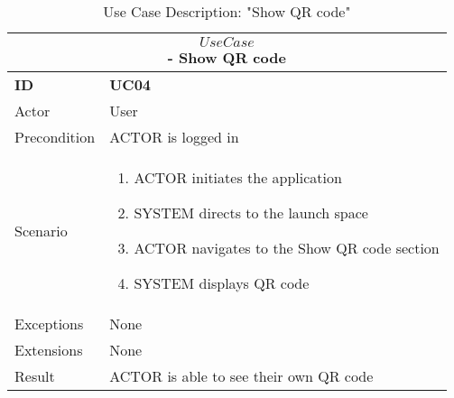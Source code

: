 \begin{center}
    \vspace{5mm}
    \begin{table}[H]
        \begin{tabular}{ |p{2cm}||p{11cm}| }
            \hline
            \multicolumn{2}{|c|}{$$Use Case$$ - Show QR code} \\ \hline
            \textbf{ID} & \textbf{UC04} \\ \hline
            Actor & User \\ \hline
            Precondition & ACTOR is logged in\\ \hline
            Scenario &
            \begin{enumerate}
                \item ACTOR initiates the application
                \item SYSTEM directs to the launch space
                \item ACTOR navigates to the Show QR code section
                \item SYSTEM displays QR code
            \end{enumerate}
            \\ \hline 
            Exceptions & None \\ \hline
            Extensions & None \\ \hline
            Result & ACTOR is able to see their own QR code \\ \hline
        \end{tabular}
        \caption{Use Case Description: "Show QR code"}
    \end{table}
    

\end{center}
